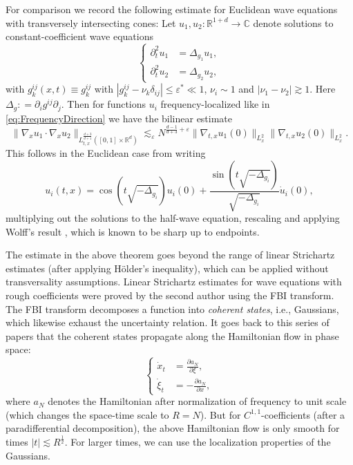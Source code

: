 \documentclass{amsart}
\theoremstyle{definition}
\newcommand{\R}{\mathbb{R}}
\newcommand{\C}{\mathbb{C}}
\begin{document}
For comparison we record the following estimate for Euclidean wave equations with transversely intersecting cones: Let $u_1, u_2 : \R^{1+d} \to \C$ denote solutions to constant-coefficient wave equations
\begin{equation*}
\left\{ \begin{array}{cl}
\partial_t^2 u_1 & = \Delta_{g_1} u_1, \\
\partial_t^2 u_2 &= \Delta_{g_2} u_2, 
\end{array} \right.
\end{equation*}
with $g^{ij}_k(x,t) \equiv g^{ij}_k$ with $|g^{ij}_k - \nu_k \delta_{ij}| \leq \varepsilon^* \ll 1$, $\nu_i \sim 1$ and $|\nu_1 - \nu_2| \gtrsim 1$. Here $\Delta_{g}: =  \partial_i g^{ij} \partial_j$.
Then for functions $u_i$  frequency-localized like in \eqref{eq:FrequencyDirection} 
we have the bilinear estimate 
\begin{equation*}
\| \nabla_x u_1 \cdot \nabla_x u_2 \|_{L^{\frac{d+3}{d+1}}_{t,x}([0,1] \times \R^d)} \lesssim_{\varepsilon} N^{\frac{d-1}{d+3}+\varepsilon} \| \nabla_{t,x} u_{1}(0) \|_{L^2_x} \| \nabla_{t,x} u_{2}(0) \|_{L^2_x}.
\end{equation*}
This follows in the Euclidean case from writing
\begin{equation*}
u_i(t,x) = \cos(t \sqrt{- \Delta_{g_i}}) u_{i}(0) + \frac{\sin(t \sqrt{- \Delta_{g_i}})}{\sqrt{- \Delta_{g_i}}} \dot{u}_{i}(0),
\end{equation*}
multiplying out the solutions to the half-wave equation, rescaling and applying Wolff's result \cite{Wolff01}, which is known to be sharp up to endpoints. 

\smallskip

The estimate in the above theorem goes beyond the range of linear Strichartz estimates (after applying H\"older's inequality), which can be applied without transversality assumptions. Linear Strichartz estimates for wave equations with rough coefficients were proved by the second author \cite{Tataru2000,Tataru2002,Tataru03} using the FBI transform. The FBI transform decomposes a function into \emph{coherent states}, i.e., Gaussians, which likewise exhaust the uncertainty relation. It goes back to this series of papers that the coherent states propagate along the Hamiltonian flow in phase space:
\begin{equation*}
\left\{ \begin{array}{cl}
\dot{x}_t &= \frac{\partial a_N}{\partial \xi}, \\
\dot{\xi}_t &= - \frac{\partial a_N}{\partial x},
\end{array} \right.
\end{equation*}
where $a_N$ denotes the Hamiltonian after normalization of frequency to unit scale
(which changes the space-time scale to $R = N$).
But for $C^{1,1}$-coefficients (after a paradifferential decomposition), the above Hamiltonian flow is only smooth for times $|t| \lesssim R^{\frac{1}{2}}$. For larger times, we can use the localization properties of the Gaussians.
\end{document}
